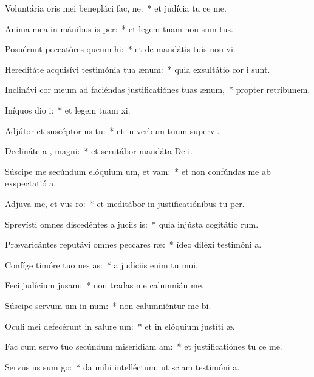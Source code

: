 \item Voluntária oris mei benepláci fac, ne:~* et judícia tu ce me.
\item Anima mea in mánibus is per:~* et legem tuam non sum tus.
\item Posuérunt peccatóres queum hi:~* et de mandátis tuis non vi.
\item Hereditáte acquisívi testimónia tua  ænum:~* quia exsultátio cor i sunt.
\item Inclinávi cor meum ad faciéndas justificatiónes tuas  ænum,~* propter retribunem.
\item Iníquos dio i:~* et legem tuam xi.
\item Adjútor et suscéptor us  tu:~* et in verbum tuum supervi.
\item Declináte a , magni:~* et scrutábor mandáta De i.
\item Súscipe me secúndum elóquium um, et vam:~* et non confúndas me ab exspectatió a.
\item Adjuva me, et vus ro:~* et meditábor in justificatiónibus tu per.
\item Sprevísti omnes discedéntes a juciis is:~* quia injústa cogitátio rum.
\item Prævaricántes reputávi omnes peccares ræ:~* ídeo diléxi testimóni a.
\item Confíge timóre tuo nes as:~* a judíciis enim tu mui.
\item Feci judícium  jusam:~* non tradas me calumnián me.
\item Súscipe servum um in num:~* non calumniéntur me bi.
\item Oculi mei defecérunt in salure um:~* et in elóquium justíti æ.
\item Fac cum servo tuo secúndum miseridiam am:~* et justificatiónes tu ce me.
\item Servus us sum go:~* da mihi intelléctum, ut sciam testimóni a.
